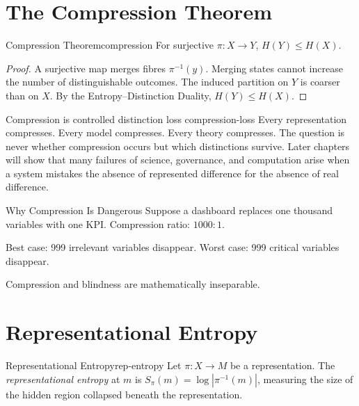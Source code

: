 \documentclass[12pt,twoside,openright]{book}
\begin{document}
\section{The Compression Theorem}
\label{sec:ch2-compression}

\begin{theorem}{Compression Theorem}{compression}
  For surjective $\pi: X \to Y$, $H(Y) \le H(X)$.
\end{theorem}

\begin{proof}
  A surjective map merges fibres $\pi^{-1}(y)$.
  Merging states cannot increase the number of
  distinguishable outcomes. The induced partition on $Y$
  is coarser than on $X$. By the Entropy--Distinction
  Duality, $H(Y) \le H(X)$.
\end{proof}

\begin{remark}{Compression is controlled distinction loss}%
  {compression-loss}
  Every representation compresses. Every model compresses.
  Every theory compresses. The question is never whether
  compression occurs but which distinctions survive.
  Later chapters will show that many failures of science,
  governance, and computation arise when a system mistakes
  the absence of represented difference for the absence
  of real difference.
\end{remark}

\begin{envelopeaside}{Why Compression Is Dangerous}
Suppose a dashboard replaces one thousand variables with one
KPI. Compression ratio: $1000{:}1$.

Best case: 999 irrelevant variables disappear. Worst case:
999 critical variables disappear.

Compression and blindness are mathematically inseparable.
\end{envelopeaside}

\section{Representational Entropy}
\label{sec:ch2-rep}

\begin{definition}{Representational Entropy}{rep-entropy}
  Let $\pi: X \to M$ be a representation. The
  \emph{representational entropy} at $m$ is
  $S_\pi(m) = \log|\pi^{-1}(m)|$,
  measuring the size of the hidden region collapsed
  beneath the representation.
\end{definition}
\end{document}
